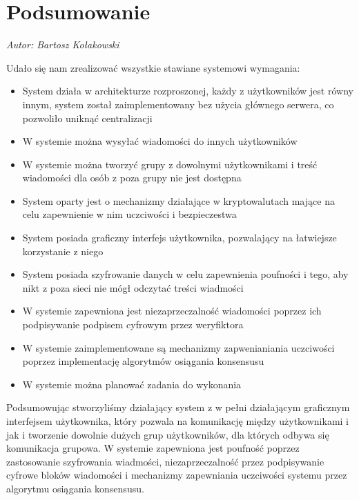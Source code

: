 \chapter{Podsumowanie}
\textit{Autor: Bartosz Kołakowski}
\par
Udało się nam zrealizować wszystkie stawiane systemowi wymagania:
\begin{itemize}
    \item System działa w architekturze rozproszonej, każdy z użytkowników jest równy innym, system został zaimplementowany bez użycia głównego serwera, co pozwoliło uniknąć centralizacji
    \item W systemie można wysyłać wiadomości do innych użytkowników
    \item W systemie można tworzyć grupy z dowolnymi użytkownikami i treść wiadomości dla osób z poza grupy nie jest dostępna
    \item System oparty jest o mechanizmy działające w kryptowalutach mające na celu zapewnienie w nim uczciwości i bezpieczestwa
    \item System posiada graficzny interfejs użytkownika, pozwalający na łatwiejsze korzystanie z niego
    \item System posiada szyfrowanie danych w celu zapewnienia poufności i tego, aby nikt z poza sieci nie mógł odczytać treści wiadmości
    \item W systemie zapewniona jest niezaprzeczalność wiadomości poprzez ich podpisywanie podpisem cyfrowym przez weryfiktora
    \item W systemie zaimplementowane są mechanizmy zapwenianiania uczciwości poprzez implementację algorytmów osiągania konsensusu
    \item W systemie można planować zadania do wykonania
\end{itemize}
\vspace{0.3\baselineskip}
Podsumowując stworzyliśmy działający system z w pełni działającym graficznym interfejsem użytkownika, który pozwala na komunikację między użytkownikami i jak i tworzenie dowolnie dużych grup użytkowników, dla których odbywa się komunikacja grupowa. W systemie zapewniona jest poufność poprzez zastosowanie szyfrowania wiadmości, niezaprzeczalność przez podpisywanie cyfrowe bloków wiadomości i mechanizmy zapewniania uczciwości systemu przez algorytmu osiągania konsensusu.